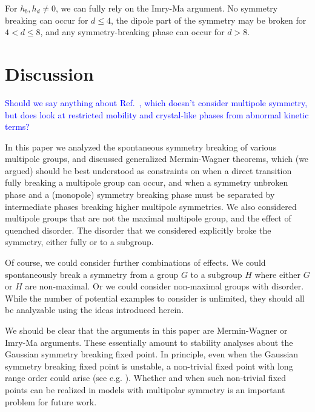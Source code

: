 \documentclass[pra,aps,twocolumn, amsfonts,amsmath,amssymb,nofootinbib,superscriptaddress]{revtex4-2}
\newcommand{\charlie}[1]{\textcolor{Blue}{#1}}
\begin{document}
For $h_b,h_d\ne 0$, we can fully rely on the Imry-Ma argument. No symmetry breaking can occur for $d\le 4$, the dipole part of the symmetry may be broken for $4<d\le 8$, and any symmetry-breaking phase can occur for $d>8$. 

\section{Discussion} \label{sec:disc}

\charlie{Should we say anything about Ref.~\cite{Argurio2021}, which doesn't consider multipole symmetry, but does look at restricted mobility and crystal-like phases from abnormal kinetic terms?}

In this paper we analyzed the spontaneous symmetry breaking of various multipole groups, and discussed generalized Mermin-Wagner theorems, which (we argued) should be best understood as constraints on when a direct transition fully breaking a multipole group can occur, and when a symmetry unbroken phase and a (monopole) symmetry breaking phase must be separated by intermediate phases breaking higher multipole symmetries. We also considered multipole groups that are not the maximal multipole group, and the effect of quenched disorder. The disorder that we considered explicitly broke the symmetry, either fully or to a subgroup.

Of course, we could consider further combinations of effects. We could spontaneously break a symmetry from a group $G$ to a subgroup $H$ where either $G$ or $H$ are non-maximal. Or we could consider non-maximal groups with disorder. While the number of potential examples to consider is unlimited, they should all be analyzable using the ideas introduced herein. 

We should be clear that the arguments in this paper are Mermin-Wagner or Imry-Ma arguments. These essentially amount to stability analyses about the Gaussian symmetry breaking fixed point. In principle, even when the Gaussian symmetry breaking fixed point is unstable, a non-trivial fixed point with long range order could arise (see e.g. \cite{TonerRadzihovsky}). Whether and when such non-trivial fixed points can be realized in models with multipolar symmetry is an important problem for future work. 
\end{document}
